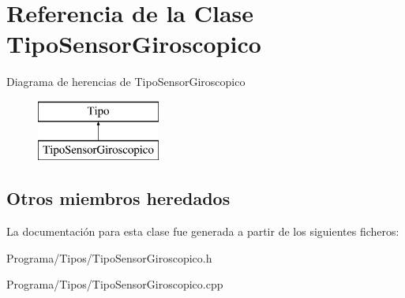 \hypertarget{class_tipo_sensor_giroscopico}{\section{Referencia de la Clase Tipo\-Sensor\-Giroscopico}
\label{class_tipo_sensor_giroscopico}
}
Diagrama de herencias de Tipo\-Sensor\-Giroscopico\begin{figure}[H]
\begin{center}
\leavevmode
\includegraphics[height=2.000000cm]{class_tipo_sensor_giroscopico}
\end{center}
\end{figure}
\subsection*{Otros miembros heredados}


La documentación para esta clase fue generada a partir de los siguientes ficheros\-:\begin{DoxyCompactItemize}
\item 
Programa/\-Tipos/Tipo\-Sensor\-Giroscopico.\-h\item 
Programa/\-Tipos/Tipo\-Sensor\-Giroscopico.\-cpp\end{DoxyCompactItemize}
